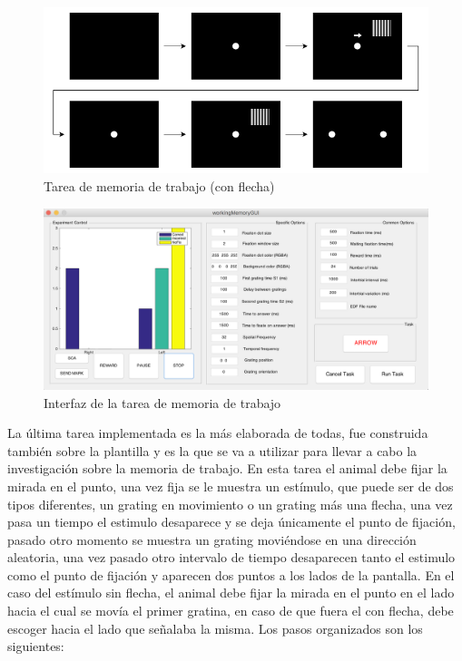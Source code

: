 \documentclass[conference]{IEEEtran}
\begin{document}
\begin{figure}[htbp]
\centerline{\includegraphics[width=\linewidth]{figures/memory_task}}
\caption{Tarea de memoria de trabajo (con flecha)}
\label{figMemoryTask}
\end{figure}

\begin{figure}
  \includegraphics[width=\textwidth]{figures/memory_gui}
  \caption{Interfaz de la tarea de memoria de trabajo}
  \label{figMemoryGui}

\end{figure}

La última tarea implementada es la más elaborada de todas, fue construida también sobre la plantilla y es la que se va a utilizar para llevar a cabo la investigación sobre la memoria de trabajo. 
En esta tarea el animal debe fijar la mirada en el punto, una vez fija se le muestra un estímulo, que puede ser de dos tipos diferentes, un grating en movimiento o un grating más una flecha, una vez pasa un tiempo el estimulo desaparece y se deja únicamente el punto de fijación, pasado otro momento se muestra un grating moviéndose en una dirección aleatoria, una vez pasado otro intervalo de tiempo desaparecen tanto el estimulo como el punto de fijación y aparecen dos puntos a los lados de la pantalla. En el caso del estímulo sin flecha, el animal debe fijar la mirada en el punto en el lado hacia el cual se movía el primer gratina, en caso de que fuera el con flecha, debe escoger  hacia el lado que señalaba la misma.
Los pasos organizados son los siguientes:
\end{document}
